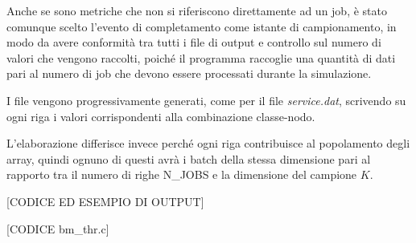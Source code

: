 Anche se sono metriche che non si riferiscono direttamente ad un job, è stato
comunque scelto l’evento di completamento come istante di campionamento, in modo
da avere conformità tra tutti i file di output e controllo sul numero di valori
che vengono raccolti, poiché il programma raccoglie una quantità di dati pari al
numero di job che devono essere processati durante la simulazione.

I file vengono progressivamente generati, come per il file \emph{service.dat},
scrivendo su ogni riga i valori corrispondenti alla combinazione classe-nodo.

L’elaborazione differisce invece perché ogni riga contribuisce al popolamento
degli array, quindi ognuno di questi avrà i batch della stessa dimensione pari
al rapporto tra il numero di righe N\_JOBS e la dimensione del campione $K$.

[CODICE ED ESEMPIO DI OUTPUT]

[CODICE bm\_thr.c]
%

%
%
